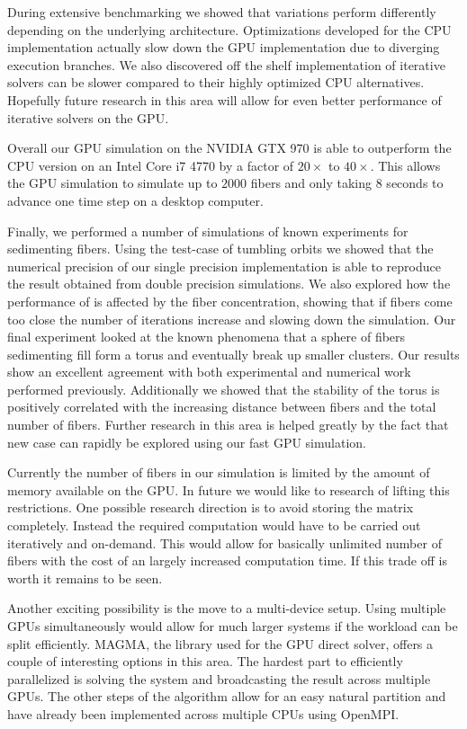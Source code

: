 \documentclass[a4paper,11pt]{kth-mag}
\begin{document}
During extensive benchmarking we showed that variations perform differently depending on the underlying architecture. Optimizations developed for the CPU implementation actually slow down the GPU implementation due to diverging execution branches. We also discovered off the shelf implementation of iterative solvers can be slower compared to their highly optimized CPU alternatives. Hopefully future research in this area will allow for even better performance of iterative solvers on the GPU.

Overall our GPU simulation on the NVIDIA GTX 970 is able to outperform the CPU version on an Intel Core i7 4770 by a factor of $20×$ to $40×$. This allows the GPU simulation to simulate up to $2000$ fibers and only taking $8$ seconds to advance one time step on a desktop computer.

Finally, we performed a number of simulations of known experiments for sedimenting fibers. Using the test-case of tumbling orbits we showed that the numerical precision of our single precision implementation is able to reproduce the result obtained from double precision simulations. We also explored how the performance of is affected by the fiber concentration, showing that if fibers come too close the number of iterations increase and slowing down the simulation. Our final experiment looked at the known phenomena that a sphere of fibers sedimenting fill form a torus and eventually break up smaller clusters. Our results show an excellent agreement with both experimental and numerical work performed previously. Additionally we showed that the stability of the torus is positively correlated with the increasing distance between fibers and the total number of fibers. Further research in this area is helped greatly by the fact that new case can rapidly be explored using our fast GPU simulation.

Currently the number of fibers in our simulation is limited by the amount of memory available on the GPU. In future we would like to research of lifting this restrictions. One possible research direction is to avoid storing the matrix completely. Instead the required computation would have to be carried out iteratively and on-demand. This would allow for basically unlimited number of fibers with the cost of an largely increased computation time. If this trade off is worth it remains to be seen.

Another exciting possibility is the move to a multi-device setup. Using multiple GPUs simultaneously would allow for much larger systems if the workload can be split efficiently. MAGMA, the library used for the GPU direct solver, offers a couple of interesting options in this area. The hardest part to efficiently parallelized is solving the system and broadcasting the result across multiple GPUs. The other steps of the algorithm allow for an easy natural partition and have already been implemented across multiple CPUs using OpenMPI.
\end{document}
